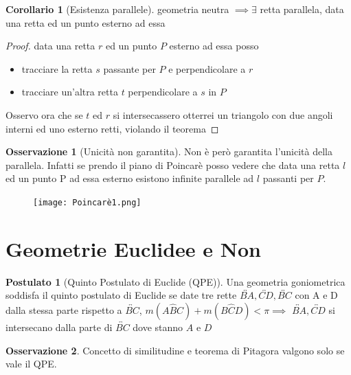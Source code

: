 \documentclass[a4paper,10pt]{article}
\theoremstyle{definition}
\theoremstyle{indentdefinition}
\theoremstyle{indentpostulate}
\newtheorem{post}{Postulato}[section]
\theoremstyle{indenttheorem}
\newtheorem{cor}{Corollario}[section]
\theoremstyle{myremark}
\newtheorem*{rem*}{Osservazione}
\theoremstyle{indentgeneral}
\newenvironment{myboxed} 
{\noindent\begin{lrbox}{\mybox}\begin{minipage}{\textwidth}}
{\end{minipage}\end{lrbox}\fbox{\usebox{\mybox}}}
\begin{document}
\begin{myboxed}
    \begin{cor}[Esistenza parallele]
        geometria neutra $\implies \exists$ retta parallela, data una retta ed un punto esterno ad essa
    \end{cor}
\end{myboxed}
\begin{proof}
    data una retta $r$ ed un punto $P$ esterno ad essa posso \begin{itemize}
        \item tracciare la retta $s$ passante per $P$ e perpendicolare a $r$
        \item tracciare un'altra retta $t$ perpendicolare a $s$ in $P$
    \end{itemize}
    Osservo ora che se $t$ ed $r$ si intersecassero otterrei un triangolo con due angoli interni ed uno esterno retti, violando il teorema  \lightning
\end{proof}

\begin{rem*}[Unicità non garantita]
    Non è però garantita l'unicità della parallela. Infatti se prendo il piano di Poincarè posso vedere che data una retta $l$ ed un punto P ad essa esterno esistono infinite parallele ad $l$ passanti per $P$.
\end{rem*}
\begin{figure}[H]
    \centering
    \texttt{[image: Poincarè1.png]}
\end{figure}

\vspace{.5cm}

\section{Geometrie Euclidee e Non}

\begin{post}[Quinto Postulato di Euclide (QPE)]
    Una geometria goniometrica soddisfa il quinto postulato di Euclide se date tre rette $\overleftrightarrow{BA}, \overleftrightarrow{CD}, \overleftrightarrow{BC}$ con A e D dalla stessa parte rispetto a $\overleftrightarrow{BC}$, $m(A\hat{B}C)+m(B\hat{C}D)<\pi \implies $ $\overleftrightarrow{BA}, \overleftrightarrow{CD}$ si intersecano dalla parte di $\overleftrightarrow{BC}$ dove stanno $A$ e $D$
\end{post}

\begin{rem*}
    Concetto di similitudine e teorema di Pitagora valgono solo se vale il QPE.
\end{rem*}
\end{document}
